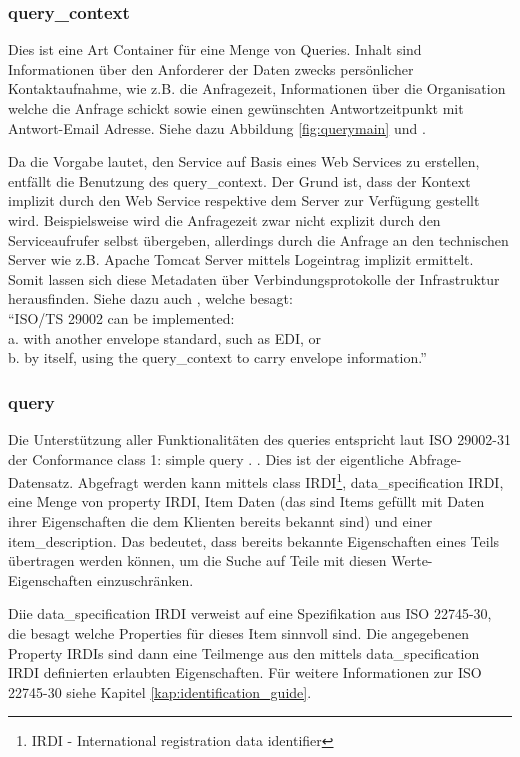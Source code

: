 \subsubsection{query\_context}
Dies ist eine Art Container für eine Menge von Queries. Inhalt sind Informationen über den Anforderer der Daten zwecks persönlicher Kontaktaufnahme, wie z.B. die Anfragezeit, Informationen über die Organisation welche die Anfrage schickt sowie einen gewünschten Antwortzeitpunkt mit Antwort-Email Adresse. Siehe dazu Abbildung \ref{fig:querymain} und \citep[Kap. 5.2.2][]{iso29002-31}.  

Da die Vorgabe lautet, den Service auf Basis eines Web Services zu erstellen, entfällt die Benutzung des query\_context. Der Grund ist, dass der Kontext  implizit durch den Web Service respektive dem Server zur Verfügung gestellt wird. Beispielsweise wird die Anfragezeit zwar nicht explizit durch den Serviceaufrufer selbst übergeben, allerdings durch die Anfrage an den technischen Server wie z.B. Apache Tomcat Server mittels Logeintrag implizit ermittelt. Somit lassen sich diese Metadaten über Verbindungsprotokolle der Infrastruktur herausfinden.  
Siehe dazu auch \citep[Kap. 6][]{iso29002-31}, welche besagt: \\ \enquote{ISO/TS 29002 can be implemented: \\
a. with another envelope standard, such as EDI, or \\
b. by itself, using the query\_context to carry envelope information.}

\subsubsection{query}
Die Unterstützung aller Funktionalitäten des queries entspricht laut ISO 29002-31 der Conformance class 1: simple query \citep[Anhang 6][]{iso29002-31}. .
Dies ist der eigentliche Abfrage-Datensatz. Abgefragt werden kann mittels class IRDI\footnote{IRDI  - International registration data identifier}, data\_specification IRDI, eine Menge von property IRDI, Item Daten (das sind Items gefüllt mit Daten ihrer Eigenschaften die dem Klienten bereits bekannt sind) und einer item\_description. Das bedeutet, dass bereits bekannte Eigenschaften eines Teils übertragen werden können, um die Suche auf Teile mit diesen Werte-Eigenschaften einzuschränken.

Diie data\_specification IRDI verweist auf eine Spezifikation aus ISO 22745-30, die besagt welche Properties für dieses Item sinnvoll sind. Die angegebenen Property IRDIs sind dann eine Teilmenge aus den mittels data\_specification IRDI definierten erlaubten Eigenschaften. Für weitere Informationen zur ISO 22745-30 siehe Kapitel \ref{kap:identification_guide}. 


